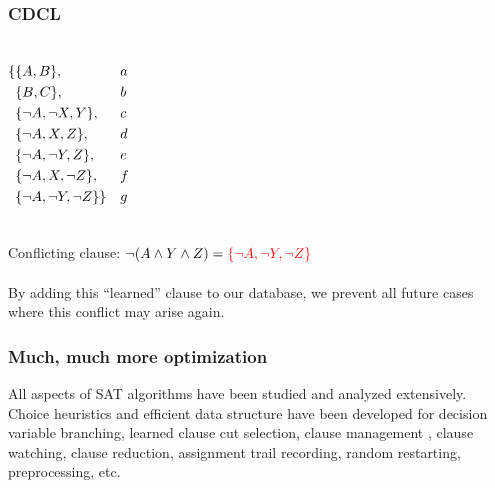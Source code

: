 \documentclass{beamer}
\DeclarePairedDelimiter{\set}{\{}{\}}
\begin{document}
\begin{frame}
    \frametitle{CDCL}
    \begin{columns}

    \begin{align*}
     \{ & \set{A,B},                      && a \\
        & \set{B,C},                      && b \\
        & \set{\neg A, \neg X, Y},        && c \\
        & \set{\neg A, X, Z},             && d \\
        & \set{\neg A, \neg Y, Z},        && e \\
        & \set{\neg A, X, \neg Z},        && f \\
        & \set{\neg A, \neg Y, \neg Z} \} && g \\
    \end{align*}
    \end{columns}
    Conflicting clause: $\neg (A \wedge Y \wedge Z) =
    {\color{red} \set{\neg A, \neg Y, \neg Z}}$
    \\~\\
    By adding this ``learned'' clause to our database,
    we prevent all future cases where this conflict
    may arise again.
\end{frame}

\begin{frame}
    \frametitle{Much, much more optimization}
    All aspects of SAT algorithms have been studied and analyzed
    extensively.
    Choice heuristics and efficient data structure
    have been developed for decision variable
    branching,
    learned clause cut selection, clause management
    , clause watching, clause reduction, assignment trail recording,
    random restarting, preprocessing, etc.
\end{frame}
\end{document}
